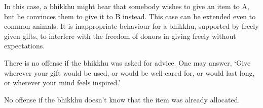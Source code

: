 In this case, a bhikkhu might hear that somebody wishes to give an item
to A, but he convinces them to give it to B instead. This case can be
extended even to common animals. It is inappropriate behaviour for a
bhikkhu, supported by freely given gifts, to interfere with the freedom
of donors in giving freely without expectations.

There is no offense if the bhikkhu was asked for advice. One may answer,
`Give wherever your gift would be used, or would be well-cared for, or
would last long, or wherever your mind feels inspired.'

No offense if the bhikkhu doesn't know that the item was already
allocated.

